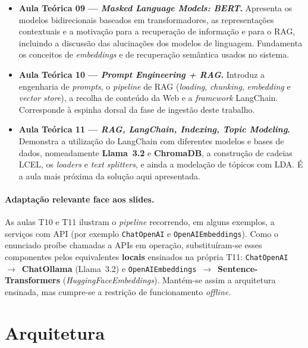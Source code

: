 \documentclass[]{ceurart}
\begin{document}
\begin{itemize}
  \item \textbf{Aula Teórica 09 --- \emph{Masked Language Models: BERT}.}
        Apresenta os modelos bidirecionais baseados em transformadores, as
        representações contextuais e a motivação para a recuperação de informação
        e para o RAG, incluindo a discussão das alucinações dos modelos de
        linguagem. Fundamenta os conceitos de \emph{embeddings} e de recuperação
        semântica usados no sistema.
  \item \textbf{Aula Teórica 10 --- \emph{Prompt Engineering + RAG}.}
        Introduz a engenharia de \emph{prompts}, o \emph{pipeline} de RAG
        (\emph{loading}, \emph{chunking}, \emph{embedding} e \emph{vector store}),
        a recolha de conteúdo da Web e a \emph{framework} LangChain. Corresponde
        à espinha dorsal da fase de ingestão deste trabalho.
  \item \textbf{Aula Teórica 11 --- \emph{RAG, LangChain, Indexing, Topic
        Modeling}.} Demonstra a utilização do LangChain com diferentes modelos e
        bases de dados, nomeadamente \textbf{Llama~3.2} e \textbf{ChromaDB}, a
        construção de cadeias LCEL, os \emph{loaders} e \emph{text splitters}, e
        ainda a modelação de tópicos com LDA. É a aula mais próxima da solução
        aqui apresentada.
\end{itemize}

\paragraph{Adaptação relevante face aos slides.}
As aulas T10 e T11 ilustram o \emph{pipeline} recorrendo, em alguns exemplos, a
serviços com API (por exemplo \texttt{ChatOpenAI} e \texttt{OpenAIEmbeddings}).
Como o enunciado proíbe chamadas a APIs em operação, substituíram-se esses
componentes pelos equivalentes \textbf{locais} ensinados na própria T11:
\texttt{ChatOpenAI}~$\rightarrow$~\textbf{ChatOllama} (Llama~3.2) e
\texttt{OpenAIEmbeddings}~$\rightarrow$~\textbf{Sentence-Transformers}
(\emph{HuggingFaceEmbeddings}). Mantém-se assim a arquitetura ensinada, mas
cumpre-se a restrição de funcionamento \emph{offline}.

\section{Arquitetura}
\label{sec:arquitetura}
\end{document}
